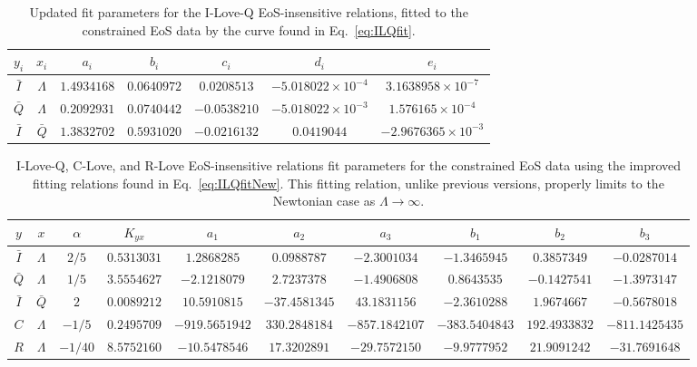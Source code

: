 \documentclass[prd,twocolumn,nofootinbib,superscriptaddress,amsmath,amssymb]{revtex4-1}
\begin{document}
\begin{table*}
\centering
\caption{
Updated fit parameters for the I-Love-Q EoS-insensitive relations, fitted to the constrained EoS data by the curve found in Eq.~\ref{eq:ILQfit}.
}\label{tab:ILQfit}
\begin{tabular}{ c  c | c c c c c } 
 \hline
 \hline
 $y_i$ & $x_i$ & $a_i$ & $b_i$ & $c_i$ & $d_i$ & $e_i$ \\
 \hline
 $\bar{I}$ & $\Lambda$ & $1.4934168$ & $0.0640972$ & $0.0208513$ & $-5.018022 \times 10^{-4}$ & $3.1638958 \times 10^{-7}$ \\
 $\bar{Q}$ & $\Lambda$ & $0.2092931$ & $0.0740442$ & $-0.0538210$ & $-5.018022 \times 10^{-3}$ & $1.576165 \times 10^{-4}$ \\ 
  $\bar{I}$ & $\bar{Q}$ & $1.3832702$ & $0.5931020$ & $-0.0216132$ & $0.0419044$ & $-2.9676365 \times 10^{-3}$ \\
 \hline
 \hline
\end{tabular}
\end{table*}

\begin{table*}
\centering
\caption{
I-Love-Q, C-Love, and R-Love EoS-insensitive relations fit parameters for the constrained EoS data using the improved fitting relations found in Eq.~\ref{eq:ILQfitNew}.
This fitting relation, unlike previous versions, properly limits to the Newtonian case as $\Lambda \rightarrow \infty$.
}\label{tab:ILQfitNew}
\begin{tabular}{ c  c  | c c c c c c c c} 
 \hline
 \hline
 $y$ & $x$ & $\alpha$ & $K_{yx}$ & $a_1$ & $a_2$ & $a_3$ & $b_1$ & $b_2$ & $b_3$ \\
 \hline
 $\bar{I}$ & $\Lambda$ & $2/5$ & $0.5313031$ & $1.2868285$ & $0.0988787$ & $-2.3001034$ & $-1.3465945$ & $0.3857349$ & $-0.0287014$\\
 $\bar{Q}$ & $\Lambda$ & $1/5$ & $3.5554627$ & $-2.1218079$ & $2.7237378$ & $-1.4906808$ & $0.8643535$ & $-0.1427541$ & $-1.3973147$\\
 $\bar{I}$ & $\bar{Q}$ & $2$ & $0.0089212$ & $10.5910815$ & $-37.4581345$ & $43.1831156$ & $-2.3610288$ & $1.9674667$ & $-0.5678018$\\
 $C$ & $\Lambda$ & $-1/5$ & $0.2495709$ & $-919.5651942$ & $330.2848184$ & $-857.1842107$ & $-383.5404843$ & $192.4933832$ & $-811.1425435$\\
 $R$ & $\Lambda$ & $-1/40$ & $8.5752160$ & $-10.5478546$ & $17.3202891$ & $-29.7572150$ & $-9.9777952$ & $21.9091242$ & $-31.7691648$\\
\hline
\hline
\end{tabular}
\end{table*}
\end{document}
